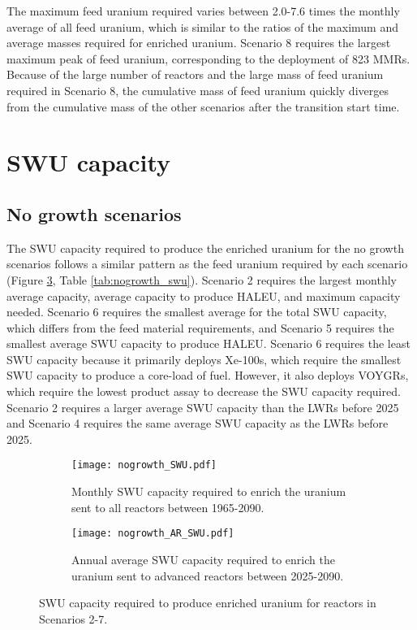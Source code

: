 The maximum feed uranium required varies between 2.0-7.6 times the monthly 
average of all feed uranium, which is similar to the ratios of the 
maximum and average masses required for enriched uranium. Scenario 8 
requires the largest maximum peak of 
feed uranium, corresponding to the deployment of 823 \glspl{MMR}. Because 
of 
the large number of reactors and the large mass of feed uranium required 
in Scenario 8, the cumulative mass of feed uranium quickly diverges from 
the cumulative mass of the other scenarios after the transition start time. 

\section{SWU capacity}
\subsection{No growth scenarios}
The \gls{SWU} capacity required to produce the enriched uranium for 
the no growth scenarios follows a similar pattern as 
the feed uranium required by each scenario (Figure \ref{fig:nogrowth_swu}, 
Table \ref{tab:nogrowth_swu}). Scenario 2 requires the largest monthly 
average capacity, average capacity to produce \gls{HALEU}, and maximum 
capacity needed. Scenario 6 requires the smallest average for the total 
\gls{SWU} capacity, which differs from the feed material requirements, 
and Scenario 5 requires the smallest average 
\gls{SWU} capacity to produce \gls{HALEU}. Scenario 6 requires the least 
\gls{SWU} capacity because it primarily deploys Xe-100s, which require the 
smallest \gls{SWU} capacity to produce a core-load of fuel. However, it 
also deploys VOYGRs, which require the lowest product assay to decrease the 
\gls{SWU} capacity required. 
Scenario 2 requires a larger average \gls{SWU} capacity 
than the \glspl{LWR} before 2025 and Scenario 4 requires the same average 
\gls{SWU} capacity as the \glspl{LWR} before 2025. 

\begin{figure}
    \centering
    \begin{subfigure}[b]{0.45\textwidth}
        \centering
        \texttt{[image: nogrowth\_SWU.pdf]}
        \caption{Monthly \gls{SWU} capacity required to enrich the  
        uranium sent to all reactors between 1965-2090.}
        \label{fig:nogrowth_all_SWU}
    \end{subfigure}
    \hfill
    \begin{subfigure}[b]{0.45\textwidth}
        \centering
        \texttt{[image: nogrowth\_AR\_SWU.pdf]}
        \caption{Annual average \gls{SWU} capacity required to enrich 
        the uranium sent to advanced reactors between 2025-2090.}
        \label{fig:nogrowth_AR_SWU}
    \end{subfigure}
       \caption{\gls{SWU} capacity required to produce enriched uranium 
       for reactors in Scenarios 2-7.}
       \label{fig:nogrowth_swu}
\end{figure}

